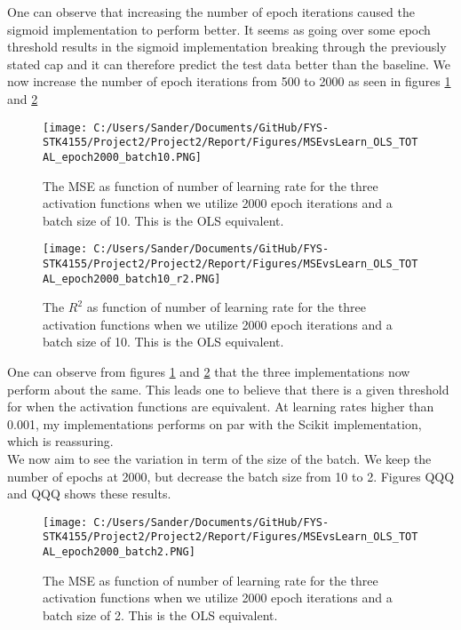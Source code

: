 \documentclass[12pt,a4paper]{article}
\begin{document}
\noindent One can observe that increasing the number of epoch iterations caused the sigmoid implementation to perform better. It seems as going over some epoch threshold results in the sigmoid implementation breaking through the previously stated cap and it can therefore predict the test data better than the baseline. We now increase the number of epoch iterations from 500 to 2000 as seen in figures \ref{fig:MSEvsLrateTOTAL5} and \ref{fig:MSEvsLrateTOTAL6}

\begin{figure}[H]
\centering
\texttt{[image: C:/Users/Sander/Documents/GitHub/FYS-STK4155/Project2/Project2/Report/Figures/MSEvsLearn\_OLS\_TOTAL\_epoch2000\_batch10.PNG]}
\caption{\label{fig:MSEvsLrateTOTAL5} The MSE as function of number of learning rate for the three activation functions when we utilize 2000 epoch iterations and a batch size of 10. This is the OLS equivalent.}
\end{figure}

\begin{figure}[H]
\centering
\texttt{[image: C:/Users/Sander/Documents/GitHub/FYS-STK4155/Project2/Project2/Report/Figures/MSEvsLearn\_OLS\_TOTAL\_epoch2000\_batch10\_r2.PNG]}
\caption{\label{fig:MSEvsLrateTOTAL6} The $R^2$ as function of number of learning rate for the three activation functions when we utilize 2000 epoch iterations and a batch size of 10. This is the OLS equivalent.}
\end{figure}

\noindent One can observe from figures \ref{fig:MSEvsLrateTOTAL5} and \ref{fig:MSEvsLrateTOTAL6} that the three implementations now perform about the same. This leads one to believe that there is a given threshold for when the activation functions are equivalent. At learning rates higher than 0.001, my implementations performs on par with the Scikit implementation, which is reassuring. 
\\
We now aim to see the variation in term of the size of the batch. We keep the number of epochs at 2000, but decrease the batch size from 10 to 2. Figures QQQ and QQQ shows these results.

\begin{figure}[H]
\centering
\texttt{[image: C:/Users/Sander/Documents/GitHub/FYS-STK4155/Project2/Project2/Report/Figures/MSEvsLearn\_OLS\_TOTAL\_epoch2000\_batch2.PNG]}
\caption{\label{fig:MSEvsLrateTOTAL7} The MSE as function of number of learning rate for the three activation functions when we utilize 2000 epoch iterations and a batch size of 2. This is the OLS equivalent.}
\end{figure}
\end{document}
